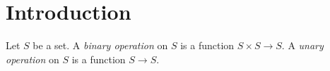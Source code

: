 \section{Introduction}

\begin{definition}
	Let $S$ be a set. A \emph{binary operation} on $S$ is a function $S \times S \to S$. A \emph{unary operation} on $S$ is a function $S \to S$.
\end{definition}